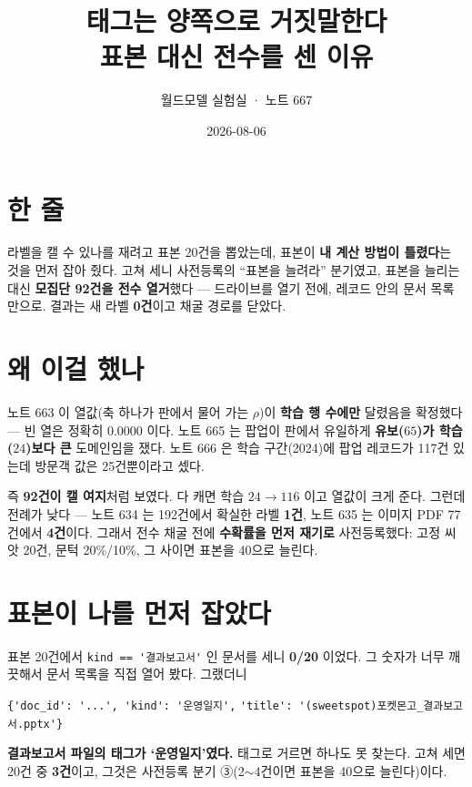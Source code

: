 \documentclass[10pt,a4paper]{article}
\title{\bfseries 태그는 양쪽으로 거짓말한다\\[2pt]
\large 표본 대신 전수를 센 이유}
\author{월드모델 실험실 · 노트 667}
\date{2026-08-06}
\begin{document}
\maketitle

\section{한 줄}

라벨을 캘 수 있나를 재려고 표본 20건을 뽑았는데, 표본이 \textbf{내 계산 방법이
틀렸다}는 것을 먼저 잡아 줬다. 고쳐 세니 사전등록의 ``표본을 늘려라'' 분기였고,
표본을 늘리는 대신 \textbf{모집단 92건을 전수 열거}했다 --- 드라이브를 열기 전에,
레코드 안의 문서 목록만으로. 결과는 새 라벨 \textbf{0건}이고 채굴 경로를 닫았다.

\section{왜 이걸 했나}

노트 663 이 열값(축 하나가 판에서 물어 가는 $\rho$)이 \textbf{학습 행 수에만}
달렸음을 확정했다 --- 빈 열은 정확히 $0.0000$ 이다. 노트 665 는 팝업이 판에서
유일하게 \textbf{유보($65$)가 학습($24$)보다 큰} 도메인임을 쟀다. 노트 666 은 학습
구간(2024)에 팝업 레코드가 117건 있는데 방문객 값은 25건뿐이라고 셌다.

즉 \textbf{92건이 캘 여지}처럼 보였다. 다 캐면 학습 $24 \to 116$ 이고 열값이
크게 준다. 그런데 전례가 낮다 --- 노트 634 는 192건에서 확실한 라벨 \textbf{1건},
노트 635 는 이미지 PDF 77건에서 \textbf{4건}이다. 그래서 전수 채굴 전에
\textbf{수확률을 먼저 재기로} 사전등록했다: 고정 씨앗 20건, 문턱 20\%/10\%,
그 사이면 표본을 40으로 늘린다.

\section{표본이 나를 먼저 잡았다}

표본 20건에서 \verb|kind == '결과보고서'| 인 문서를 세니 \textbf{0/20} 이었다.
그 숫자가 너무 깨끗해서 문서 목록을 직접 열어 봤다. 그랬더니

\begin{center}
\verb|{'doc_id': '...', 'kind': '운영일지',|
\verb|'title': '(sweetspot)포켓몬고_결과보고서.pptx'}|
\end{center}

\textbf{결과보고서 파일의 태그가 `운영일지'였다.} 태그로 거르면 하나도 못 찾는다.
고쳐 세면 20건 중 \textbf{3건}이고, 그것은 사전등록 분기 ③(2$\sim$4건이면 표본을
40으로 늘린다)이다.
\end{document}
